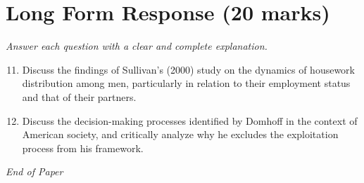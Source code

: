 \documentclass[12pt]{article}
\begin{document}
\section*{Long Form Response (20 marks)}
\textit{Answer each question with a clear and complete explanation.}
\begin{enumerate}[label=\arabic*.]
\setcounter{enumi}{10}
\item Discuss the findings of Sullivan's (2000) study on the dynamics of housework distribution among men, particularly in relation to their employment status and that of their partners.
\item Discuss the decision-making processes identified by Domhoff in the context of American society, and critically analyze why he excludes the exploitation process from his framework.
\end{enumerate}

\vfill
\noindent\textit{End of Paper}
\end{document}
